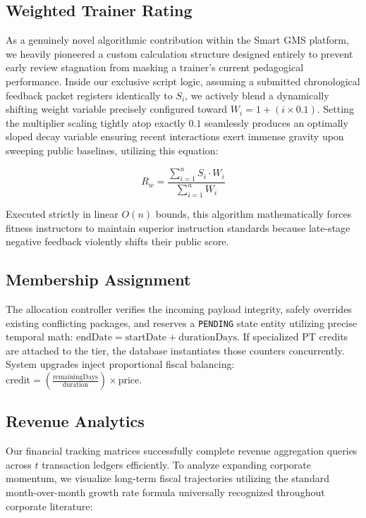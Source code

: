 \subsection{Weighted Trainer Rating}\label{weighted-trainer-rating}

As a genuinely novel algorithmic contribution within the Smart GMS
platform, we heavily pioneered a custom calculation structure designed
entirely to prevent early review stagnation from masking a trainer's
current pedagogical performance. Inside our exclusive script logic,
assuming a submitted chronological feedback packet registers identically
to \(S_i\), we actively blend a dynamically shifting weight variable
precisely configured toward \(W_i = 1 + (i \times 0.1)\). Setting the
multiplier scaling tightly atop exactly \(0.1\) seamlessly produces an
optimally sloped decay variable ensuring recent interactions exert
immense gravity upon sweeping public baselines, utilizing this equation:

\begin{equation}
R_w = \frac{\displaystyle\sum_{i=1}^{n} S_i \cdot W_i}{\displaystyle\sum_{i=1}^{n} W_i}
\end{equation}

Executed strictly in linear \(O(n)\) bounds, this algorithm
mathematically forces fitness instructors to maintain superior
instruction standards because late-stage negative feedback violently
shifts their public score.

\subsection{Membership Assignment}\label{membership-assignment}

The allocation controller verifies the incoming payload integrity,
safely overrides existing conflicting packages, and reserves a
\texttt{PENDING} state entity utilizing precise temporal math:
\(\text{endDate} = \text{startDate} + \text{durationDays}\). If
specialized PT credits are attached to the tier, the database
instantiates those counters concurrently. System upgrades inject
proportional fiscal balancing:
\(\text{credit} = \left(\frac{\text{remainingDays}}{\text{duration}}\right) \times \text{price}\).

\subsection{Revenue Analytics}\label{revenue-analytics}

Our financial tracking matrices successfully complete revenue
aggregation queries across \(t\) transaction ledgers efficiently. To
analyze expanding corporate momentum, we visualize long-term fiscal
trajectories utilizing the standard month-over-month growth rate formula
universally recognized throughout corporate literature:

